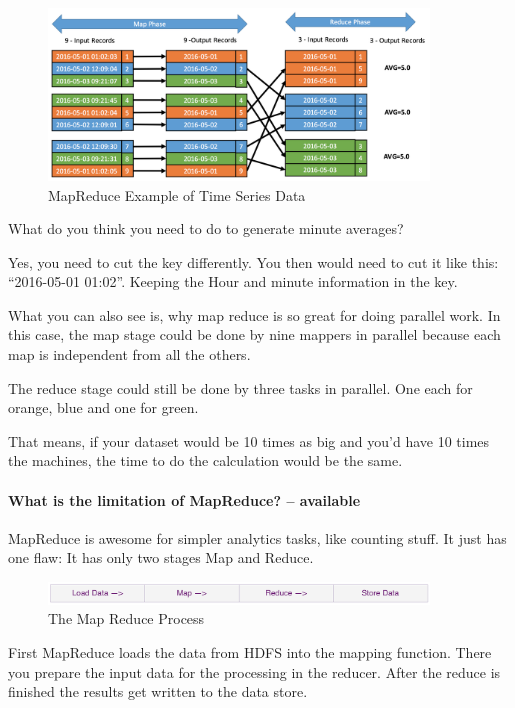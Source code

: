 \documentclass[12pt]{scrartcl} %
\begin{document}
\begin{figure}[htbp]
  \centering
     \includegraphics[width=0.9\textwidth]{images/MapReduce-Time-Series-example}
  \caption{MapReduce Example of Time Series Data}
  \label{fig:Bild1}
\end{figure}

What do you think you need to do to generate minute averages?

Yes, you need to cut the key differently. You then would need to cut it like this: “2016-05-01 01:02”. Keeping the Hour and minute information in the key.

What you can also see is, why map reduce is so great for doing parallel work. In this case, the map stage could be done by nine mappers in parallel because each map is independent from all the others.

The reduce stage could still be done by three tasks in parallel. One each for orange, blue and one for green.

That means, if your dataset would be 10 times as big and you’d have 10 times the machines, the time to do the calculation would be the same.

\paragraph{What is the limitation of MapReduce? -- available}
MapReduce is awesome for simpler analytics tasks, like counting stuff. It just has one flaw: It has only two stages Map and Reduce.

\begin{figure}[htbp]
  \centering
     \includegraphics[width=0.9\textwidth]{images/MapReduce-Process}
  \caption{The Map Reduce Process}
  \label{fig:Bild1}
\end{figure}

First MapReduce loads the data from HDFS into the mapping function. There you prepare the input data for the processing in the reducer. After the reduce is finished the results get written to the data store.
\end{document}

